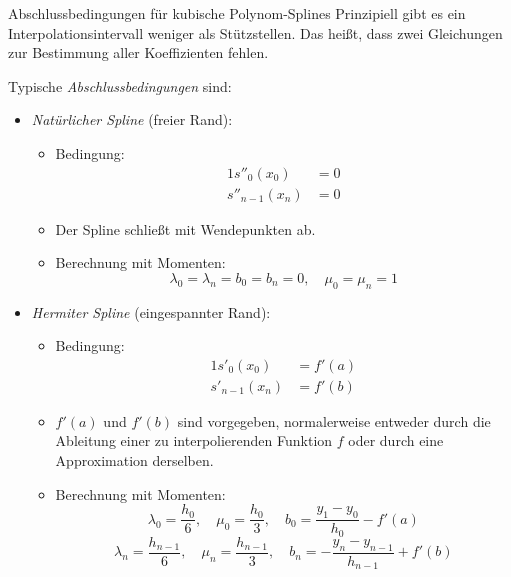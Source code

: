 \begin{defi}{Abschlussbedingungen für kubische Polynom-Splines}
    Prinzipiell gibt es ein Interpolationsintervall weniger als Stützstellen. 
    Das heißt, dass zwei Gleichungen zur Bestimmung aller Koeffizienten fehlen. 
    
    Typische \emph{Abschlussbedingungen} sind: 
    \begin{itemize}
        \item \emph{Natürlicher Spline} (freier Rand):
              \begin{itemize}
                  \item Bedingung:
                        \begin{alignat*}{1}
                            s''_0(x_0)     & = 0 \\
                            s''_{n-1}(x_n) & = 0
                        \end{alignat*}
                  \item Der Spline schließt mit Wendepunkten ab.
                  \item Berechnung mit Momenten:
                        \[
                            \lambda_0 = \lambda_n = b_0 = b_n = 0, \quad \mu_0 = \mu_n = 1
                        \]
              \end{itemize}
        \item \emph{Hermiter Spline} (eingespannter Rand):
              \begin{itemize}
                  \item Bedingung:
                        \begin{alignat*}{1}
                            s'_0(x_0)     & = f'(a) \\
                            s'_{n-1}(x_n) & = f'(b)
                        \end{alignat*}
                  \item $f'(a)$ und $f'(b)$ sind vorgegeben, normalerweise entweder durch die Ableitung einer zu interpolierenden Funktion $f$ oder durch eine Approximation derselben.
                  \item Berechnung mit Momenten:
                        \[
                            \lambda_0 = \frac{h_0}{6}, \quad \mu_0 = \frac{h_0}{3}, \quad b_0 = \frac{y_1 - y_0}{h_0} - f'(a)
                        \]
                        \[
                            \lambda_n = \frac{h_{n-1}}{6}, \quad \mu_n = \frac{h_{n-1}}{3}, \quad b_n = - \frac{y_n - y_{n-1}}{h_{n-1}} + f'(b)
                        \]

\end{itemize}
\end{itemize}
\end{defi}
